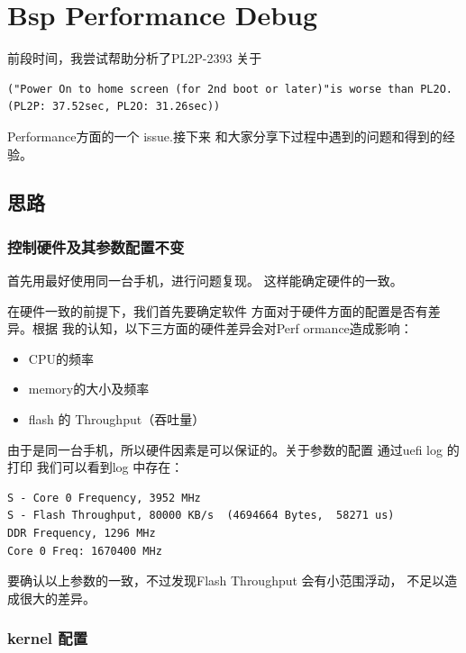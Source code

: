 \chapter{Bsp Performance Debug}


前段时间，我尝试帮助分析了PL2P-2393 关于
\begin{lstlisting}
("Power On to home screen (for 2nd boot or later)"is worse than PL2O.(PL2P: 37.52sec, PL2O: 31.26sec))
\end{lstlisting}
Performance方面的一个 issue.接下来
和大家分享下过程中遇到的问题和得到的经验。


\section{思路}




\subsection{控制硬件及其参数配置不变}
首先用最好使用同一台手机，进行问题复现。
这样能确定硬件的一致。


在硬件一致的前提下，我们首先要确定软件
方面对于硬件方面的配置是否有差异。根据
我的认知，以下三方面的硬件差异会对Perf
ormance造成影响：

\begin{itemize}

\item CPU的频率

\item memory的大小及频率

\item flash 的 Throughput（吞吐量）

\end{itemize}


由于是同一台手机，所以硬件因素是可以保证的。关于参数的配置
通过uefi log 的打印 我们可以看到log 中存在：
\begin{lstlisting}
S - Core 0 Frequency, 3952 MHz
S - Flash Throughput, 80000 KB/s  (4694664 Bytes,  58271 us)
DDR Frequency, 1296 MHz
Core 0 Freq: 1670400 MHz
\end{lstlisting}

要确认以上参数的一致，不过发现Flash Throughput 会有小范围浮动，
不足以造成很大的差异。

\subsection{kernel 配置}
 
